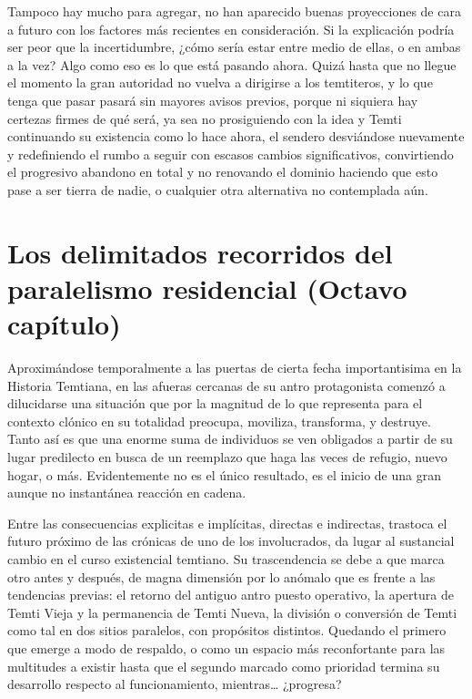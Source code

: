 \documentclass[
  spanish,
]{book}
\begin{document}
Tampoco hay mucho para agregar, no han aparecido buenas proyecciones de cara a futuro con los factores más recientes en consideración. Si la explicación podría ser peor que la incertidumbre, ¿cómo sería estar entre medio de ellas, o en ambas a la vez? Algo como eso es lo que está pasando ahora. Quizá hasta que no llegue el momento la gran autoridad no vuelva a dirigirse a los temtiteros, y lo que tenga que pasar pasará sin mayores avisos previos, porque ni siquiera hay certezas firmes de qué será, ya sea no prosiguiendo con la idea y Temti continuando su existencia como lo hace ahora, el sendero desviándose nuevamente y redefiniendo el rumbo a seguir con escasos cambios significativos, convirtiendo el progresivo abandono en total y no renovando el dominio haciendo que esto pase a ser tierra de nadie, o cualquier otra alternativa no contemplada aún.

\hypertarget{los-delimitados-recorridos-del-paralelismo-residencial-octavo-capuxedtulo}{%
\chapter{Los delimitados recorridos del paralelismo residencial (Octavo capítulo)}\label{los-delimitados-recorridos-del-paralelismo-residencial-octavo-capuxedtulo}}

Aproximándose temporalmente a las puertas de cierta fecha importantisima en la Historia Temtiana, en las afueras cercanas de su antro protagonista comenzó a dilucidarse una situación que por la magnitud de lo que representa para el contexto clónico en su totalidad preocupa, moviliza, transforma, y destruye. Tanto así es que una enorme suma de individuos se ven obligados a partir de su lugar predilecto en busca de un reemplazo que haga las veces de refugio, nuevo hogar, o más. Evidentemente no es el único resultado, es el inicio de una gran aunque no instantánea reacción en cadena.

Entre las consecuencias explicitas e implícitas, directas e indirectas, trastoca el futuro próximo de las crónicas de uno de los involucrados, da lugar al sustancial cambio en el curso existencial temtiano. Su trascendencia se debe a que marca otro antes y después, de magna dimensión por lo anómalo que es frente a las tendencias previas: el retorno del antiguo antro puesto operativo, la apertura de Temti Vieja y la permanencia de Temti Nueva, la división o conversión de Temti como tal en dos sitios paralelos, con propósitos distintos. Quedando el primero que emerge a modo de respaldo, o como un espacio más reconfortante para las multitudes a existir hasta que el segundo marcado como prioridad termina su desarrollo respecto al funcionamiento, mientras\ldots{} ¿progresa?
\end{document}
